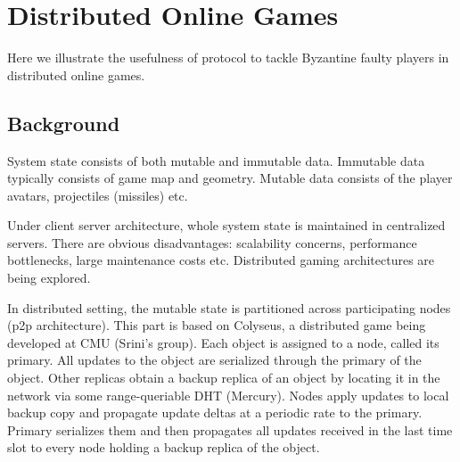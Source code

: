 \documentclass[twocolumn,10pt]{article}
\begin{document}
{\section{Distributed Online Games}
Here we illustrate the usefulness of \Sys protocol to tackle Byzantine faulty players
in distributed online games. 

\subsection{Background}
System state consists of both mutable and immutable data. Immutable data typically consists
of game map and geometry. Mutable data consists of the player avatars, projectiles (missiles) etc.

Under client server architecture, whole system state is maintained in centralized servers. There
are obvious disadvantages: scalability concerns, performance bottlenecks, large maintenance costs etc.
Distributed gaming architectures are being explored.

In distributed setting, the mutable state is partitioned across participating nodes (p2p architecture).
This part is based on Colyseus, a distributed game being developed at CMU (Srini's group).
Each object is assigned to a node, called its primary. All updates to the object are serialized
through the primary of the object. Other replicas obtain a backup replica of an object by locating
it in the network via some range-queriable DHT (Mercury). Nodes apply updates to local backup 
copy and propagate update deltas at a periodic rate to the primary. Primary serializes them and
then propagates all updates received in the last time slot to every node holding a backup replica
of the object. 

}
\end{document}
